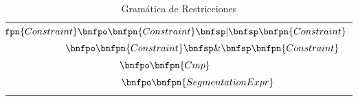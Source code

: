 \setlength\LTleft{0cm}
\begin{longtable}{  c  }
    \caption{Gramática de Restricciones}\label{chap2:grammar}                                                                    \\
    \endfirsthead
    \hline
    \endhead
    \hline
    \endfoot
    \hline
    \endlastfoot

    $\hspace{-0.8cm} \bnfpn{Constraint} \bnfpo \bnfpn{Constraint} \bnfsp | \bnfsp \bnfpn{Constraint}$                            \\
    $\hspace{1.7cm} \bnfpo \bnfpn{Constraint} \bnfsp \& \bnfsp \bnfpn{Constraint}$                                               \\
    $\hspace{-1cm} \bnfpo \bnfpn{Cmp}$                                                                                           \\
    $\hspace{1.4cm} \bnfpo \bnfpn{SegmentationExpr}$                                                                             \\
    \\


\end{longtable}
